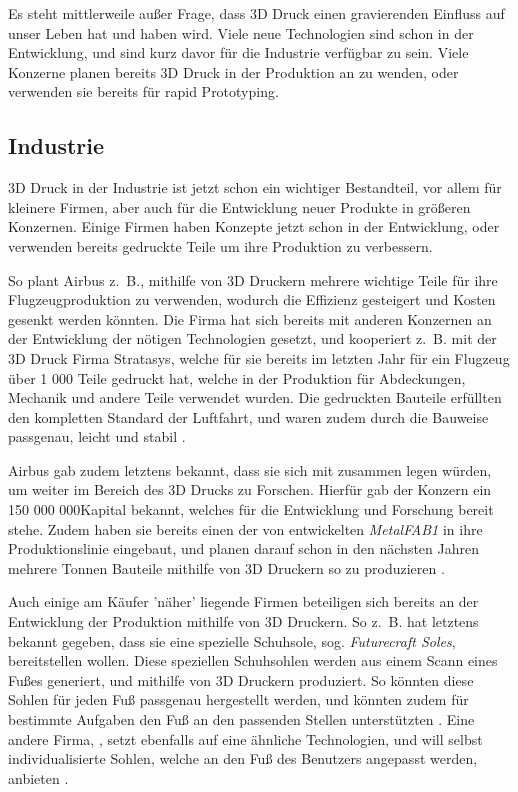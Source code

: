 Es steht mittlerweile außer Frage, dass 3D Druck einen gravierenden Einfluss auf unser Leben hat und haben wird. Viele neue Technologien sind schon in der Entwicklung, und sind kurz davor für die Industrie verfügbar zu sein. Viele Konzerne planen bereits 3D Druck in der Produktion an zu wenden, oder verwenden sie bereits für rapid Prototyping.


\subsection{Industrie}

3D Druck in der Industrie ist jetzt schon ein wichtiger Bestandteil, vor allem für kleinere Firmen, aber auch für die Entwicklung neuer Produkte in größeren Konzernen. Einige Firmen haben Konzepte jetzt schon in der Entwicklung, oder verwenden bereits gedruckte Teile um ihre Produktion zu verbessern.

So plant Airbus z.~B., mithilfe von 3D Druckern mehrere wichtige Teile für ihre Flugzeugproduktion zu verwenden, wodurch die Effizienz gesteigert und Kosten gesenkt werden könnten. Die Firma hat sich bereits mit anderen Konzernen an der Entwicklung der nötigen Technologien gesetzt, und kooperiert z.~B. mit der 3D Druck Firma Stratasys, welche für sie bereits im letzten Jahr für ein Flugzeug über 1 000 Teile gedruckt hat, welche in der Produktion für Abdeckungen, Mechanik und andere Teile verwendet wurden. Die gedruckten Bauteile erfüllten den kompletten Standard der Luftfahrt, und waren zudem durch die Bauweise passgenau, leicht und stabil \parencite{1000_PART_PLANE}.

Airbus gab zudem letztens bekannt, dass sie sich mit  zusammen legen würden, um weiter im Bereich des 3D Drucks zu Forschen. Hierfür gab der Konzern ein 150 000 000\EURO Kapital bekannt, welches für die Entwicklung und Forschung bereit stehe. Zudem haben sie bereits einen der von  entwickelten \emph{MetalFAB1} in ihre Produktionslinie eingebaut, und planen darauf schon in den nächsten Jahren mehrere Tonnen Bauteile mithilfe von 3D Druckern so zu produzieren \parencite{AIRBUS_METALFAB}.

Auch einige am Käufer 'näher' liegende Firmen beteiligen sich bereits an der Entwicklung der Produktion mithilfe von 3D Druckern.
So z.~B. hat  letztens bekannt gegeben, dass sie eine spezielle Schuhsole, sog. \emph{Futurecraft Soles}, bereitstellen wollen. Diese speziellen Schuhsohlen werden aus einem Scann eines Fußes generiert, und mithilfe von 3D Druckern produziert. So könnten diese Sohlen für jeden Fuß passgenau hergestellt werden, und könnten zudem für bestimmte Aufgaben den Fuß an den passenden Stellen unterstützten \parencite{ADIDAS}. Eine andere Firma, , setzt ebenfalls auf eine ähnliche Technologien, und will selbst individualisierte Sohlen, welche an den Fuß des Benutzers angepasst werden, anbieten \parencite{NEW_BALANCE}.

